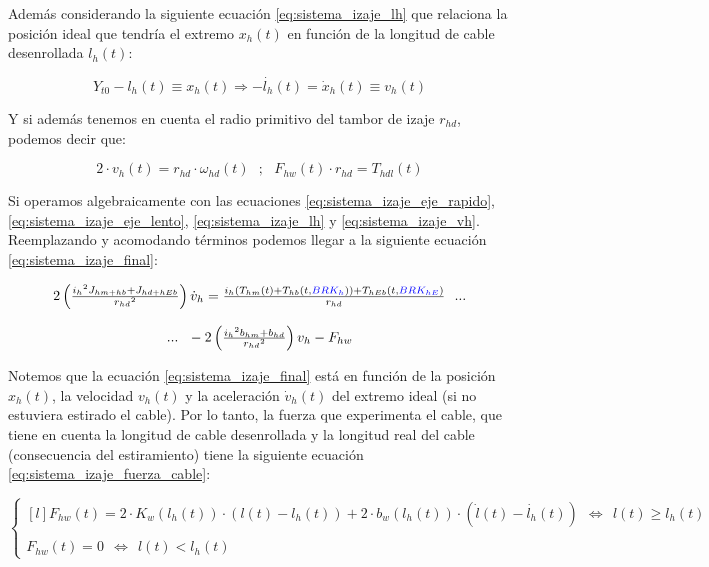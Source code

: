 \documentclass[11pt]{article}
\begin{document}
Además considerando la siguiente ecuación \ref{eq:sistema_izaje_lh} que relaciona la posición ideal que tendría el extremo $x_{h}(t)$ en función de la longitud de cable desenrollada $l_{h}(t)$:

\begin{equation}
	\label{eq:sistema_izaje_lh}
	Y_{t0}-l_{h}(t)\equiv x_{h}(t) \Rightarrow -\dot{l_{h}}(t)=\dot{x}_{h}(t)\equiv v_{h}(t)
\end{equation}

Y si además tenemos en cuenta el radio primitivo del tambor de izaje $r_{hd}$, podemos decir que:

\begin{equation}
	\label{eq:sistema_izaje_vh}
	2\cdot v_{h}(t)=r_{hd}\cdot \omega_{hd}(t)\ \ \ ;\ \ \ F_{hw}(t)\cdot r_{hd}=T_{hdl}(t)
\end{equation}

Si operamos algebraicamente con las ecuaciones \ref{eq:sistema_izaje_eje_rapido}, \ref{eq:sistema_izaje_eje_lento}, \ref{eq:sistema_izaje_lh} y \ref{eq:sistema_izaje_vh}. Reemplazando y acomodando términos podemos llegar a la siguiente ecuación \ref{eq:sistema_izaje_final}:

\begin{equation}
	\label{eq:sistema_izaje_final}
	\begin{matrix}
		2\left ( \frac{{i_{h}}^{2}J_{hm+hb}+J_{hd+hEb}}{{r_{hd}}^{2}} \right )\dot{v}_{h}=\frac{i_{h}\left ( T_{hm}(t)+T_{hb}(t,{\color{blue}BRK_{h}}) \right )+T_{hEb}(t,{\color{blue}BRK_{hE}})}{r_{hd}}\ \ ...
		\\
		\\
		...\ \ -2\left ( \frac{{i_{h}}^{2}b_{hm}+b_{hd}}{{r_{hd}}^{2}} \right )v_{h}-F_{hw}
	\end{matrix}
\end{equation}

Notemos que la ecuación \ref{eq:sistema_izaje_final} está en función de la posición $x_{h}(t)$, la velocidad $v_{h}(t)$ y la aceleración $\dot{v}_{h}(t)$ del extremo ideal (si no estuviera estirado el cable). Por lo tanto, la fuerza que experimenta el cable, que tiene en cuenta la longitud de cable desenrollada y la longitud real del cable (consecuencia del estiramiento) tiene la siguiente ecuación \ref{eq:sistema_izaje_fuerza_cable}:

\begin{equation}
	\label{eq:sistema_izaje_fuerza_cable}
	\left\{
		\begin{matrix*}[l]
		F_{hw}(t)=2\cdot K_{w}\left ( l_{h}(t) \right )\cdot \left ( l(t)-l_{h}(t) \right )+2\cdot b_{w}\left ( l_{h}(t) \right )\cdot ( \dot{l}(t)-\dot{l_{h}}(t) ) \ \ \Leftrightarrow\ \ l(t)\geq l_{h}(t)
		\\
		\\ 
		F_{hw}(t)= 0\ \ \Leftrightarrow\ \ l(t)<l_{h}(t)
		\end{matrix*}
	\right.
\end{equation}
\end{document}
